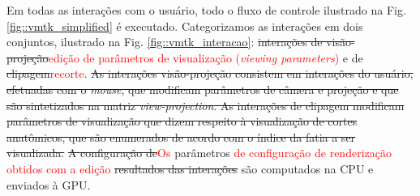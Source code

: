 \begin{figure}[ht]
 \end{figure}
 
 Em todas as interações com o usuário, todo o fluxo de controle ilustrado na Fig. \ref{fig::vmtk_simplified} é executado. Categorizamos as interações em dois conjuntos, ilustrado na Fig. \ref{fig::vmtk_interacao}: \sout{interações de visão-projeção}\textcolor{red}{edição de parâmetros de visualização (\textit{viewing parameters})} e de \sout{clipagem}\textcolor{red}{recorte}. \sout{As interações visão-projeção consistem em interações do usuário, efetuadas com o \textit{mouse}, que modificam parâmetros de câmera e projeção e que são sintetizados na matriz \textit{view-projection}. As interações de clipagem modificam parâmetros de visualização que dizem respeito à visualização de cortes anatômicos, que são enumerados de acordo com o índice da fatia a ser visualizada.} \sout{A configuração de}\textcolor{red}{Os} parâmetros \textcolor{red}{de configuração de renderização obtidos com a edição} \sout{resultados das interações} são computados na CPU e enviados à GPU.
 

